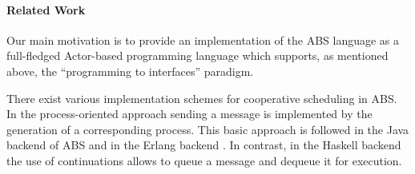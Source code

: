 \paragraph{Related Work}

Our main motivation is to provide an implementation of the ABS language  as a full-fledged Actor-based programming language which supports,
as mentioned above,  the ``programming to interfaces'' paradigm.

There exist various implementation schemes for cooperative scheduling in ABS.
In the process-oriented approach sending a message  is implemented by the generation of a  corresponding process. This basic approach is followed in the Java backend of ABS \cite{abs,Schafer} and in the Erlang backend \cite{Erlang}.
In contrast, in the Haskell backend \cite{Haskell}  the use of continuations allows
to queue  a message and dequeue it for execution.





